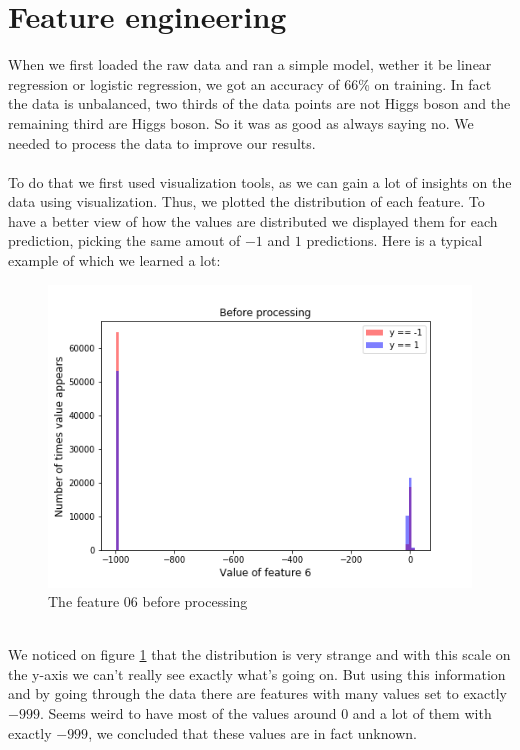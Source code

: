 \documentclass[10pt,conference,compsocconf]{IEEEtran}
\begin{document}
\section{Feature engineering}
When we first loaded the raw data and ran a simple model, wether it be linear regression or logistic regression, we got an accuracy of 66\% on training. In fact the data is unbalanced, two thirds of the data points are not Higgs boson and the remaining third are Higgs boson. So it was as good as always saying no. We needed to process the data to improve our results. \\\\
To do that we first used visualization tools, as we can gain a lot of insights on the data using visualization. Thus, we plotted the distribution of each feature. To have a better view of how the values are distributed we displayed them for each prediction, picking the same amout of $-1$ and $1$ predictions. Here is a typical example of which we learned a lot:
\begin{figure}[h!]
  \centering
  \includegraphics[width=\columnwidth]{graph-features/feature-06-raw.png}
  \caption{The feature 06 before processing}
	\label{fig:feature-06-raw}
\end{figure} \\
We noticed on figure \ref{fig:feature-06-raw} that the distribution is very strange and with this scale on the y-axis we can't really see exactly what's going on. But using this information and by going through the data there are features with many values set to exactly $-999$. Seems weird to have most of the values around 0 and a lot of them with exactly $-999$, we concluded that these values are in fact unknown.\\\\
\end{document}
